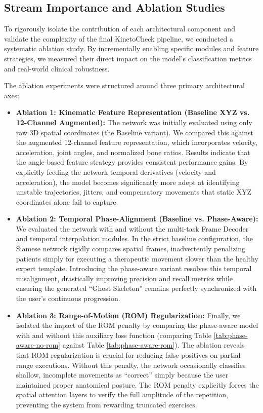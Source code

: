 \subsection{Stream Importance and Ablation Studies}
To rigorously isolate the contribution of each architectural component and validate the complexity of the final KinetoCheck pipeline, we conducted a systematic ablation study. By incrementally enabling specific modules and feature strategies, we measured their direct impact on the model's classification metrics and real-world clinical robustness. 

The ablation experiments were structured around three primary architectural axes:

\begin{itemize}
    \item \textbf{Ablation 1: Kinematic Feature Representation (Baseline XYZ vs. 12-Channel Augmented):} 
    The network was initially evaluated using only raw 3D spatial coordinates (the Baseline variant). We compared this against the augmented 12-channel feature representation, which incorporates velocity, acceleration, joint angles, and normalized bone ratios. Results indicate that the angle-based feature strategy provides consistent performance gains. By explicitly feeding the network temporal derivatives (velocity and acceleration), the model becomes significantly more adept at identifying unstable trajectories, jitters, and compensatory movements that static XYZ coordinates alone fail to capture.
    
    \item \textbf{Ablation 2: Temporal Phase-Alignment (Baseline vs. Phase-Aware):} 
    We evaluated the network with and without the multi-task Frame Decoder and temporal interpolation modules. In the strict baseline configuration, the Siamese network rigidly compares spatial frames, inadvertently penalizing patients simply for executing a therapeutic movement slower than the healthy expert template. Introducing the phase-aware variant resolves this temporal misalignment, drastically improving precision and recall metrics while ensuring the generated ``Ghost Skeleton'' remains perfectly synchronized with the user's continuous progression.
    
    \item \textbf{Ablation 3: Range-of-Motion (ROM) Regularization:} 
    Finally, we isolated the impact of the ROM penalty by comparing the phase-aware model with and without this auxiliary loss function (comparing Table \ref{tab:phase-aware-no-rom} against Table \ref{tab:phase-aware-rom}). The ablation reveals that ROM regularization is crucial for reducing false positives on partial-range executions. Without this penalty, the network occasionally classifies shallow, incomplete movements as ``correct'' simply because the user maintained proper anatomical posture. The ROM penalty explicitly forces the spatial attention layers to verify the full amplitude of the repetition, preventing the system from rewarding truncated exercises.
\end{itemize}


